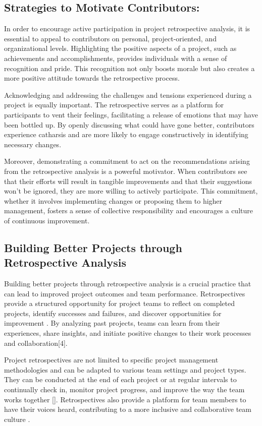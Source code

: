 \documentclass{article}
\begin{document}
\subsection{Strategies to Motivate Contributors:}
\noindent In order to encourage active participation in project retrospective analysis, it is essential to appeal to contributors on personal, project-oriented, and organizational levels. Highlighting the positive aspects of a project, such as achievements and accomplishments, provides individuals with a sense of recognition and pride. This recognition not only boosts morale but also creates a more positive attitude towards the retrospective process.

Acknowledging and addressing the challenges and tensions experienced during a project is equally important. The retrospective serves as a platform for participants to vent their feelings, facilitating a release of emotions that may have been bottled up. By openly discussing what could have gone better, contributors experience catharsis and are more likely to engage constructively in identifying necessary changes.

Moreover, demonstrating a commitment to act on the recommendations arising from the retrospective analysis is a powerful motivator. When contributors see that their efforts will result in tangible improvements and that their suggestions won't be ignored, they are more willing to actively participate. This commitment, whether it involves implementing changes or proposing them to higher management, fosters a sense of collective responsibility and encourages a culture of continuous improvement.

\subsection{Building Better Projects through Retrospective Analysis}
\noindent Building better projects through retrospective analysis is a crucial practice that can lead to improved project outcomes and team performance. Retrospectives provide a structured opportunity for project teams to reflect on completed projects, identify successes and failures, and discover opportunities for improvement \cite{papoutsakis2007sharing}. By analyzing past projects, teams can learn from their experiences, share insights, and initiate positive changes to their work processes and collaboration[4]. 

Project retrospectives are not limited to specific project management methodologies and can be adapted to various team settings and project types. They can be conducted at the end of each project or at regular intervals to continually check in, monitor project progress, and improve the way the team works together [\cite{papoutsakis2007sharing}]. Retrospectives also provide a platform for team members to have their voices heard, contributing to a more inclusive and collaborative team culture \cite{papoutsakis2007sharing}. 
\end{document}
